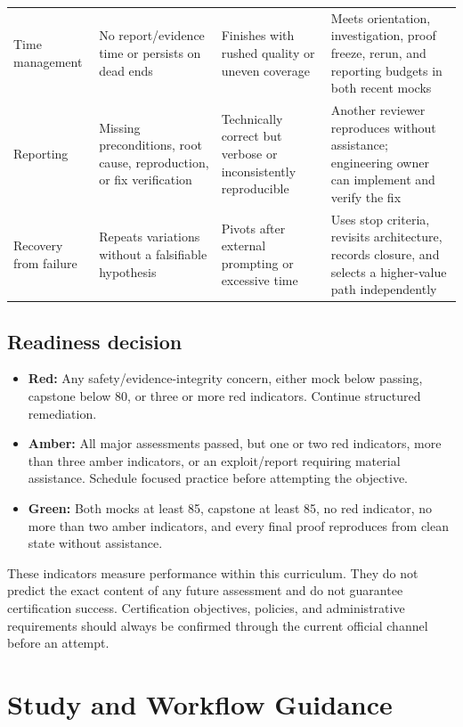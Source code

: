 \documentclass[11pt]{article}
\begin{document}
\begin{longtable}{@{}L{0.19\textwidth}L{0.24\textwidth}L{0.24\textwidth}L{0.24\textwidth}@{}}
Time management & No report/evidence time or persists on dead ends & Finishes with rushed quality or uneven coverage & Meets orientation, investigation, proof freeze, rerun, and reporting budgets in both recent mocks \\
Reporting & Missing preconditions, root cause, reproduction, or fix verification & Technically correct but verbose or inconsistently reproducible & Another reviewer reproduces without assistance; engineering owner can implement and verify the fix \\
Recovery from failure & Repeats variations without a falsifiable hypothesis & Pivots after external prompting or excessive time & Uses stop criteria, revisits architecture, records closure, and selects a higher-value path independently \\
\bottomrule
\end{longtable}
\normalsize

\subsection{Readiness decision}
\begin{itemize}
  \item \textbf{Red:} Any safety/evidence-integrity concern, either mock below passing, capstone below 80, or three or more red indicators. Continue structured remediation.
  \item \textbf{Amber:} All major assessments passed, but one or two red indicators, more than three amber indicators, or an exploit/report requiring material assistance. Schedule focused practice before attempting the objective.
  \item \textbf{Green:} Both mocks at least 85, capstone at least 85, no red indicator, no more than two amber indicators, and every final proof reproduces from clean state without assistance.
\end{itemize}

\begin{warningbox}[title=Readiness limitation]
These indicators measure performance within this curriculum. They do not predict
the exact content of any future assessment and do not guarantee certification
success. Certification objectives, policies, and administrative requirements
should always be confirmed through the current official channel before an attempt.
\end{warningbox}

\section{Study and Workflow Guidance}
\end{document}
